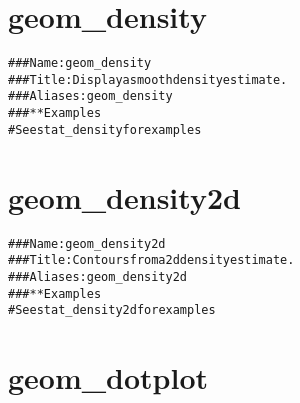 \documentclass[a4paper,titlepage]{tufte-handout}\usepackage{graphicx, color}
\makeatletter
\newcommand{\hlcomment}[1]{\textcolor[rgb]{0.180392156862745,0.6,0.341176470588235}{#1}}%
\newenvironment{kframe}{%
 \def\at@end@of@kframe{}%
 \ifinner\ifhmode%
  \def\at@end@of@kframe{\end{minipage}}%
  \begin{minipage}{\columnwidth}%
 \fi\fi%
 \def\FrameCommand##1{\hskip\@totalleftmargin \hskip-\fboxsep
 \colorbox{shadecolor}{##1}\hskip-\fboxsep
     \hskip-\linewidth \hskip-\@totalleftmargin \hskip\columnwidth}%
 \MakeFramed {\advance\hsize-\width
   \@totalleftmargin\z@ \linewidth\hsize
   \@setminipage}}%
 {\par\unskip\endMakeFramed%
 \at@end@of@kframe}
\newenvironment{knitrout}{}{} %
\makeatother
\begin{document}
\section{geom\_density}

\begin{knitrout}
\color{fgcolor}\begin{kframe}
\begin{alltt}
\hlcomment{### Name: geom_density}
\hlcomment{### Title: Display a smooth density estimate.}
\hlcomment{### Aliases: geom_density}
\hlcomment{### ** Examples}
\hlcomment{# See stat_density for examples}
\end{alltt}
\end{kframe}
\end{knitrout}


\section{geom\_density2d}

\begin{knitrout}
\color{fgcolor}\begin{kframe}
\begin{alltt}
\hlcomment{### Name: geom_density2d}
\hlcomment{### Title: Contours from a 2d density estimate.}
\hlcomment{### Aliases: geom_density2d}
\hlcomment{### ** Examples}
\hlcomment{# See stat_density2d for examples}
\end{alltt}
\end{kframe}
\end{knitrout}


\section{geom\_dotplot}
\end{document}
